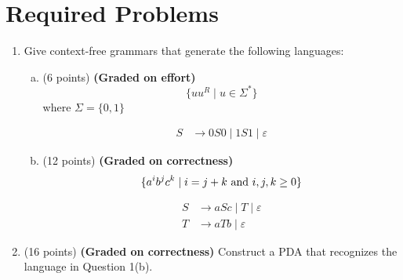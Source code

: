 \documentclass{article}
\theoremstyle{definition}
\newenvironment {solution}
{
\begin{tcolorbox}
}
{
\end{tcolorbox}
}
\begin{document}
\section{Required Problems}
\begin{enumerate}
    \item Give context-free grammars that generate the following languages:
    \begin{enumerate}[(a)]
        \item (6 points) \textbf{(Graded on effort)} \[\{uu^R \mid u \in \Sigma^*\}\] where $\Sigma = \{0, 1\}$
        \begin{solution}
            \begin{align*}
                S &\rightarrow 0S0 \mid 1S1 \mid \varepsilon
            \end{align*}
        \end{solution}
        \item (12 points) \textbf{(Graded on correctness)}
        \[\{a^ib^jc^k \mid i = j + k\textnormal{ and } i,j,k \geq 0\}\]
        \begin{solution}
            \begin{align*}
                S &\rightarrow aSc \mid T \mid \varepsilon \\
                T &\rightarrow aTb \mid \varepsilon
            \end{align*}
        \end{solution}
    \end{enumerate}

    \item (16 points) \textbf{(Graded on correctness)} Construct a PDA that recognizes the language in Question 1(b).
    \begin{solution}
        \begin{center}
            
\end{center}
\end{solution}
\end{enumerate}
\end{document}
